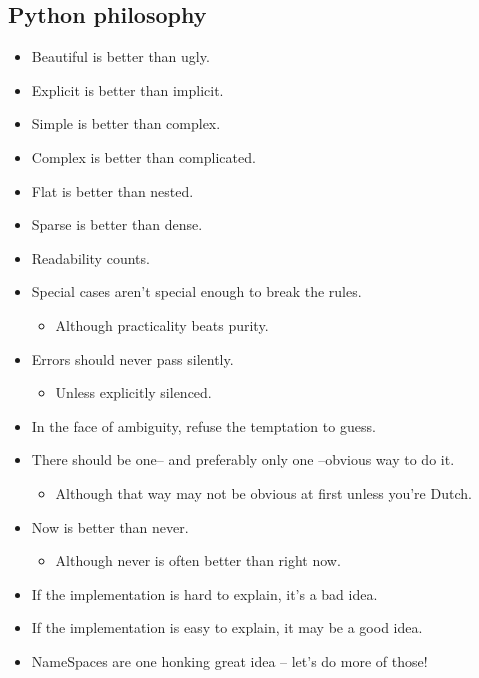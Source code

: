 \subsection*{Python philosophy}

\begin{frame}
  \begin{itemize}
  \item Beautiful is better than ugly.
  \item Explicit is better than implicit.
  \item Simple is better than complex.
  \item Complex is better than complicated.
  \item Flat is better than nested.
  \item Sparse is better than dense.
  \item Readability counts.
  \end{itemize}
\end{frame}

\begin{frame}
  \begin{itemize}
  \item Special cases aren't special enough to break the rules.
    \begin{itemize}
    \item Although practicality beats purity.
    \end{itemize}
  \item Errors should never pass silently.
    \begin{itemize}
    \item Unless explicitly silenced.
    \end{itemize}
  \item In the face of ambiguity, refuse the temptation to guess.
  \item There should be one-- and preferably only one --obvious way to do it.
    \begin{itemize}
    \item Although that way may not be obvious at first unless you're Dutch.
    \end{itemize}
  \end{itemize}
\end{frame}

\begin{frame}
  \begin{itemize}
    \item Now is better than never.
      \begin{itemize}
      \item Although never is often better than right now.
      \end{itemize}
    \item If the implementation is hard to explain, it's a bad idea.
    \item If the implementation is easy to explain, it may be a good idea.
    \item NameSpaces are one honking great idea -- let's do more of those!
  \end{itemize}
\end{frame}

